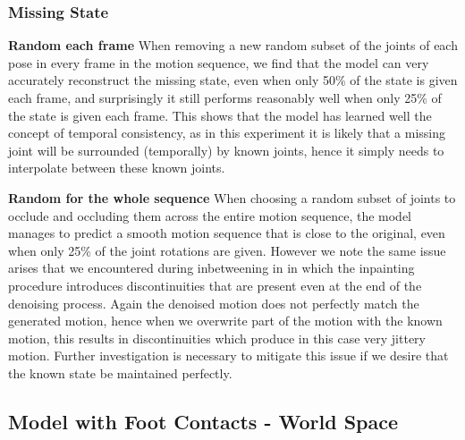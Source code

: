 \subsubsection{Missing State}
\textbf{Random each frame}
When removing a new random subset of the joints of each pose in every frame in the motion sequence, we find that the model can very accurately reconstruct the missing state, even when only 50\% of the state is given each frame, and surprisingly it still performs reasonably well when only 25\% of the state is given each frame. This shows that the model has learned well the concept of temporal consistency, as in this experiment it is likely that a missing joint will be surrounded (temporally) by known joints, hence it simply needs to interpolate between these known joints.


\textbf{Random for the whole sequence}
When choosing a random subset of joints to occlude and occluding them across the entire motion sequence, the model manages to predict a smooth motion sequence that is close to the original, even when only 25\% of the joint rotations are given. However we note the same issue arises that we encountered during inbetweening in  in which the inpainting procedure introduces discontinuities that are present even at the end of the denoising process. Again the denoised motion does not perfectly match the generated motion, hence when we overwrite part of the motion with the known motion, this results in discontinuities which produce in this case very jittery motion. Further investigation is necessary to mitigate this issue if we desire that the known state be maintained perfectly.

\subsection{Model with Foot Contacts - World Space}
\label{sec:diffusion_contacts_world_space}

